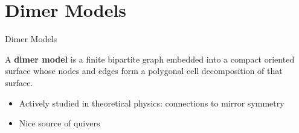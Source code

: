 \section{Dimer Models}

\begin{frame}{Dimer Models}
    \begin{definition}
        \justifying
        A \textbf{dimer model} is a finite bipartite graph embedded into a compact oriented surface whose nodes and edges form a polygonal cell decomposition of that surface.
    \end{definition}

    \begin{itemize}
        \item Actively studied in theoretical physics: connections to mirror symmetry
        
        \item Nice source of quivers
    \end{itemize}
\end{frame}

